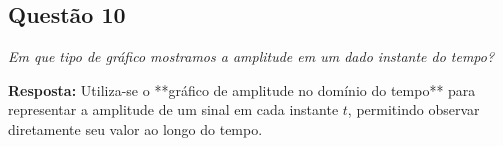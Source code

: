 \subsection*{Questão 10}

\textit{Em que tipo de gráfico mostramos a amplitude em um dado instante do tempo?}\par

\textbf{Resposta: }  
Utiliza-se o **gráfico de amplitude no domínio do tempo** para representar a amplitude de um sinal em cada instante \(t\), permitindo observar diretamente seu valor ao longo do tempo.